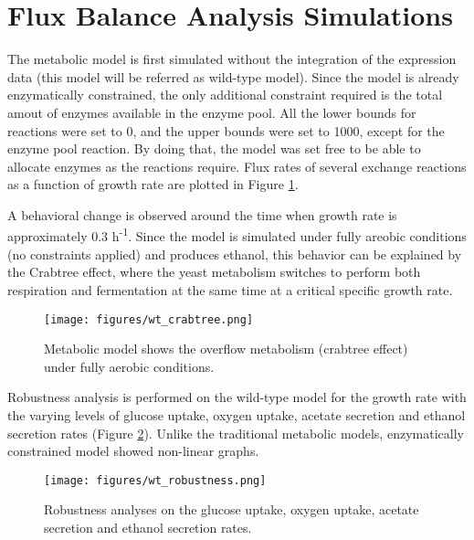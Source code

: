 \section{Flux Balance Analysis Simulations}

The metabolic model is first simulated without the integration of the expression data (this model will be referred as wild-type model). Since the model is already enzymatically constrained, the only additional constraint required is the total amout of enzymes available in the enzyme pool. All the lower bounds for reactions were set to 0, and the upper bounds were set to 1000, except for the enzyme pool reaction. By doing that, the model was set free to be able to allocate enzymes as the reactions require. Flux rates of several exchange reactions as a function of growth rate are plotted in Figure \ref{fig:wt_crabtree}.

A behavioral change is observed around the time when growth rate is approximately 0.3 h\textsuperscript{-1}. Since the model is simulated under fully areobic conditions (no constraints applied) and produces ethanol, this behavior can be explained by the Crabtree effect, where the yeast metabolism switches to perform both respiration and fermentation at the same time at a critical specific growth rate.

\begin{figure}[H]
  \begin{center}
  \texttt{[image: figures/wt\_crabtree.png]}
  \caption[Metabolic model shows the overflow metabolism]{Metabolic model shows the overflow metabolism (crabtree effect) under fully aerobic conditions.}
  \label{fig:wt_crabtree}
  \end{center}
\end{figure}

Robustness analysis is performed on the wild-type model for the growth rate with the varying levels of glucose uptake, oxygen uptake, acetate secretion and ethanol secretion rates (Figure \ref{fig:wt_robustness}). Unlike the traditional metabolic models, enzymatically constrained model showed non-linear graphs.

\begin{figure}[H]
  \begin{center}
  \texttt{[image: figures/wt\_robustness.png]}
  \caption[Robustness analyses on the glucose uptake, oxygen uptake, acetate secretion and ethanol secretion rates]{Robustness analyses on the glucose uptake, oxygen uptake, acetate secretion and ethanol secretion rates.}
  \label{fig:wt_robustness}
  \end{center}
\end{figure}

